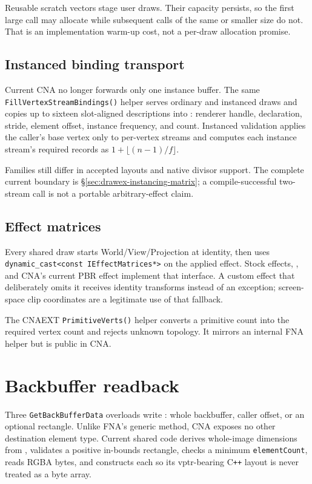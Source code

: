 Reusable scratch vectors stage user draws. Their capacity persists, so the first large call may
allocate while subsequent calls of the same or smaller size do not. That is an implementation
warm-up cost, not a per-draw allocation promise.

\subsection{Instanced binding transport}
\label{sec:graphicsdevice-instancing}

Current CNA no longer forwards only one instance buffer. The same
\texttt{FillVertexStreamBindings()} helper serves ordinary and instanced draws and copies up to
sixteen slot-aligned descriptions into : renderer handle, declaration,
stride, element offset, instance frequency, and count. Instanced validation applies the caller's
base vertex only to per-vertex streams and computes each instance stream's required records as
$1+\lfloor(n-1)/f\rfloor$.

Families still differ in accepted layouts and native divisor support. The complete current
boundary is \S\ref{sec:drawex-instancing-matrix}; a compile-successful two-stream call is not a
portable arbitrary-effect claim.

\subsection{Effect matrices}
\label{sec:extract-matrices}

Every shared draw starts World/View/Projection at identity, then uses
\texttt{dynamic\_cast<const IEffectMatrices*>} on the applied effect. Stock effects,
, and CNA's current PBR effect implement that interface. A custom effect
that deliberately omits it receives identity transforms instead of an exception; screen-space
clip coordinates are a legitimate use of that fallback.

The CNAEXT \texttt{PrimitiveVerts()} helper converts a primitive count into the required vertex
count and rejects unknown topology. It mirrors an internal FNA helper but is public in CNA.

\section{Backbuffer readback}
\label{sec:backbuffer-readback}

Three \texttt{GetBackBufferData} overloads write : whole backbuffer, caller
offset, or an optional rectangle. Unlike FNA's generic method, CNA exposes no other destination
element type. Current shared code derives whole-image dimensions from
, validates a positive in-bounds rectangle, checks a minimum
\texttt{elementCount}, reads RGBA bytes, and constructs each  so its vptr-bearing
C\texttt{++} layout is never treated as a byte array.

